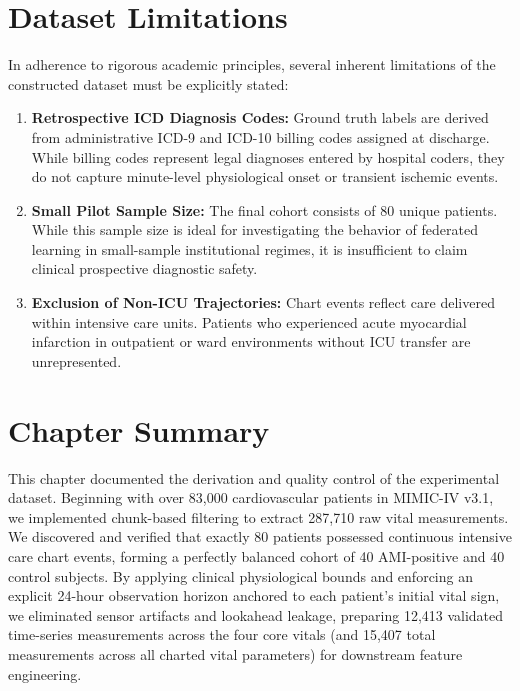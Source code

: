 \documentclass[12pt,a4paper,oneside]{report}
\begin{document}
\section{Dataset Limitations}
\label{sec:dataset_limitations}

In adherence to rigorous academic principles, several inherent limitations of the constructed dataset must be explicitly stated:
\begin{enumerate}
    \item \textbf{Retrospective ICD Diagnosis Codes:} Ground truth labels are derived from administrative ICD-9 and ICD-10 billing codes assigned at discharge. While billing codes represent legal diagnoses entered by hospital coders, they do not capture minute-level physiological onset or transient ischemic events.
    \item \textbf{Small Pilot Sample Size:} The final cohort consists of 80 unique patients. While this sample size is ideal for investigating the behavior of federated learning in small-sample institutional regimes, it is insufficient to claim clinical prospective diagnostic safety.
    \item \textbf{Exclusion of Non-ICU Trajectories:} Chart events reflect care delivered within intensive care units. Patients who experienced acute myocardial infarction in outpatient or ward environments without ICU transfer are unrepresented.
\end{enumerate}

\section{Chapter Summary}
\label{sec:chapter3_summary}

This chapter documented the derivation and quality control of the experimental dataset. Beginning with over 83,000 cardiovascular patients in MIMIC-IV v3.1, we implemented chunk-based filtering to extract 287,710 raw vital measurements. We discovered and verified that exactly 80 patients possessed continuous intensive care chart events, forming a perfectly balanced cohort of 40 AMI-positive and 40 control subjects. By applying clinical physiological bounds and enforcing an explicit 24-hour observation horizon anchored to each patient's initial vital sign, we eliminated sensor artifacts and lookahead leakage, preparing 12,413 validated time-series measurements across the four core vitals (and 15,407 total measurements across all charted vital parameters) for downstream feature engineering.
\end{document}
